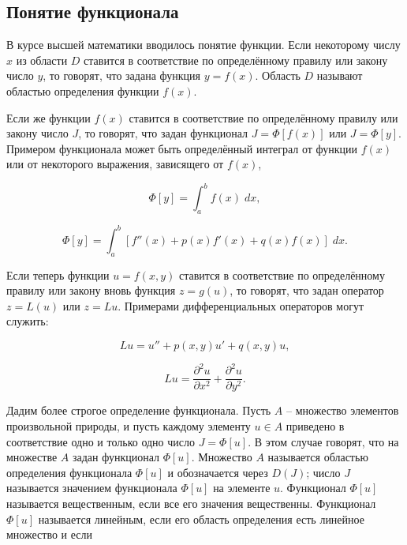\documentclass{article}
\begin{document}
\subsection{Понятие функционала}

В курсе высшей математики вводилось понятие функции. Если некоторому числу $x$ из области $D$ ставится в соответствие по определённому правилу или закону число $y$, то говорят, что задана функция $y=f(x)$. Область $D$ называют областью определения функции $f(x)$.

Если же функции $f(x)$ ставится в соответствие по определённому правилу или закону число $J$, то говорят, что задан функционал $J = \Phi[f(x)]$ или 
$J = \Phi[y]$. Примером функционала может быть определённый интеграл от функции $f(x)$ или от некоторого выражения, зависящего от $f(x)$,

\begin{displaymath}
	\Phi[y] = \int_{a}^{b} f(x) \; dx,
\end{displaymath}

\begin{displaymath}
	\Phi[y] = \int_{a}^{b} [f''(x) + p(x)f'(x) + q(x)f(x)] \;  dx.
\end{displaymath}

Если теперь функции $u = f(x, y)$ ставится в соответствие по определённому правилу или закону вновь функция $z = g(u)$, то говорят, что задан оператор $z = L(u)$ или $z = Lu$. Примерами дифференциальных операторов могут служить:

\begin{displaymath}
	Lu = u'' + p(x,y)u' + q(x,y)u,
\end{displaymath}

\begin{displaymath}
    Lu = \frac{\partial^2 u}{\partial x^2} + \frac{\partial^2 u}{\partial y^2}.
\end{displaymath}

Дадим более строгое определение функционала. Пусть $A$ – множество элементов произвольной природы, и пусть каждому элементу $u \in A$ приведено в соответствие одно и только одно число $J = \Phi[u]$. В этом случае говорят, что на множестве $A$ задан функционал $\Phi[u]$. Множество $A$ называется областью определения функционала $\Phi[u]$ и обозначается через $D(J)$; число $J$ называется значением функционала $\Phi[u]$ на элементе $u$. Функционал $\Phi[u]$ называется вещественным, если все его значения вещественны. Функционал $\Phi[u]$ называется линейным, если его область определения есть линейное множество и если
\end{document}
